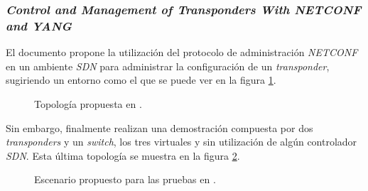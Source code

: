 \subsubsection*{\textit{Control and Management of Transponders With NETCONF and YANG}}

El documento \parencite{netconfsddn} propone la utilización del protocolo de administración \textit{NETCONF} en un ambiente \textit{SDN} para administrar la configuración de un \textit{transponder}, sugiriendo un entorno como el que se puede ver en la figura \ref{fig:netconfsddn1}.


\begin{figure}[H]
	\centering 
	\caption[Topología propuesta en.]{Topología propuesta en \parencite{netconfsddn}.}
	\label{fig:netconfsddn1}
\end{figure}

Sin embargo, finalmente realizan una demostración compuesta por dos \textit{transponders} y un \textit{switch}, los tres virtuales y sin utilización de algún controlador \textit{SDN}. Esta última topología se muestra en la figura \ref{fig:netconfsddn2}.


\begin{figure}[H]
	\centering 
	\caption[Escenario propuesto para las pruebas en.]{Escenario propuesto para las pruebas en \parencite{netconfsddn}.}
	\label{fig:netconfsddn2}
\end{figure}

